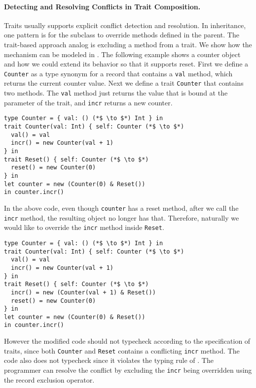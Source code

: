 \paragraph{Detecting and Resolving Conflicts in Trait Composition.}
Traits usually supports explicit conflict detection and resolution.
In inheritance, one pattern is for the subclass to override methods defined in the parent.
The trait-based approach analog is excluding a method from a trait.
We show how the mechanism can be modeled in \name.
The following example shows a counter object and how we could extend its
behavior so that it supports reset. First we define a \lstinline$Counter$ as a
type synonym for a record that contains a \lstinline$val$ method, which returns
the current counter value. Next we define a trait \lstinline$Counter$ that
contains two methods. The \lstinline$val$ method just returns the value that is
bound at the parameter of the trait, and \lstinline$incr$ returns a new counter.

\begin{lstlisting}
type Counter = { val: () (*$ \to $*) Int } in
trait Counter(val: Int) { self: Counter (*$ \to $*)
  val() = val
  incr() = new Counter(val + 1)
} in
trait Reset() { self: Counter (*$ \to $*)
  reset() = new Counter(0)
} in
let counter = new (Counter(0) & Reset())
in counter.incr()
\end{lstlisting}

In the above code, even though \lstinline$counter$ has a reset method, after we
call the \lstinline$incr$ method, the resulting object no longer has that.
Therefore, naturally we would like to override the \lstinline$incr$ method
inside \lstinline$Reset$.

\begin{lstlisting}
type Counter = { val: () (*$ \to $*) Int } in
trait Counter(val: Int) { self: Counter (*$ \to $*)
  val() = val
  incr() = new Counter(val + 1)
} in
trait Reset() { self: Counter (*$ \to $*)
  incr() = new (Counter(val + 1) & Reset())
  reset() = new Counter(0)
} in
let counter = new (Counter(0) & Reset())
in counter.incr()
\end{lstlisting}

However the modified code should not typecheck according to the specification of
traits, since both \lstinline$Counter$ and \lstinline$Reset$ contains a
conflicting \lstinline$incr$ method. The code also does not typecheck since it
violates the typing rule of \name. The programmer can resolve the conflict by
excluding the \lstinline$incr$ being overridden using the record exclusion
operator.

